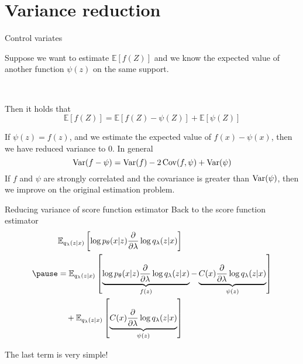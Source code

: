 \section{Variance reduction}

\begin{frame}{Control variates}

Suppose we want to estimate $\mathbb E[f(Z)]$ and we know the expected value of another function $\psi(z)$ on the same support. \pause

~

Then it holds that
\begin{equation}
	\mathbb E[f(Z)] = \mathbb E[f(Z) - \psi(Z)] + \mathbb E[\psi(Z)]
\end{equation}

\pause

If $\psi(z) = f(z)$, and we estimate the expected value of $f(x) - \psi(x)$, then we have reduced variance to $0$. \pause In general
\begin{equation}
\operatorname{Var}(f - \psi) = \operatorname{Var}(f) - 2\operatorname{Cov}(f, \psi) + \operatorname{Var}(\psi)
\end{equation}
If $f$ and $\psi$ are strongly correlated and the covariance is greater than $\operatorname{Var}(\psi)$, then we improve on the original estimation problem.


\end{frame}

\begin{frame}[plain]{Reducing variance of score function estimator}
Back to the score function estimator
\begin{equation*}
\begin{aligned}
&\mathbb E_{q_\lambda(z|x)} \left[  \log p_\theta(x|z)  \pdv{\lambda}\log q_\lambda(z|x)\right] \\ \pause
&= \mathbb E_{q_\lambda(z|x)} \left[  \underbrace{\log p_\theta(x|z)  \pdv{\lambda}\log q_\lambda(z|x)}_{f(z)} - \underbrace{C(x)\pdv{\lambda}\log q_\lambda(z|x)}_{\psi(z)} \right] \\
&\quad + \mathbb E_{q_\lambda(z|x)} \left[ \underbrace{C(x)\pdv{\lambda}\log q_\lambda(z|x)}_{\psi(z)} \right]
\end{aligned}
\end{equation*}

The last term is very simple! 

\end{frame}


